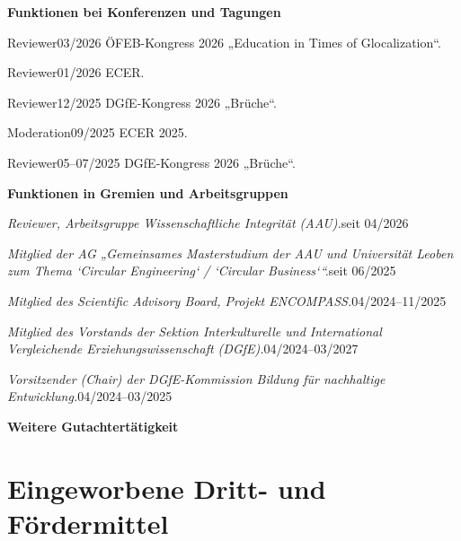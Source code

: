     \resumeProjectHeading
      {\textbf{Funktionen bei Konferenzen und Tagungen}}{}

    \resumeSubheading
      {Reviewer}{03/2026}
      {ÖFEB-Kongress 2026 „Education in Times of Glocalization“.}{}

    \resumeSubheading
      {Reviewer}{01/2026}
      {ECER.}{}

    \resumeSubheading
      {Reviewer}{12/2025}
      {DGfE-Kongress 2026 „Brüche“.}{}

    \resumeSubheading
      {Moderation}{09/2025}
      {ECER 2025.}{}

    \resumeSubheading
      {Reviewer}{05–07/2025}
      {DGfE-Kongress 2026 „Brüche“.}{}


    \resumeProjectHeading
      {\textbf{Funktionen in Gremien und Arbeitsgruppen}}{}

        \resumeProjectHeading
      {\textit{Reviewer, Arbeitsgruppe Wissenschaftliche Integrität (AAU).}}{seit 04/2026}


        \resumeProjectHeading
      {\textit{Mitglied der AG „Gemeinsames Masterstudium der AAU und Universität Leoben zum Thema ‘Circular Engineering‘ / ‘Circular Business‘“.}}{seit 06/2025}


        \resumeProjectHeading
      {\textit{Mitglied des Scientific Advisory Board, Projekt ENCOMPASS.}}{04/2024–11/2025}


        \resumeProjectHeading
      {\textit{Mitglied des Vorstands der Sektion Interkulturelle und International Vergleichende Erziehungswissenschaft (DGfE).}}{04/2024–03/2027}


        \resumeProjectHeading
      {\textit{Vorsitzender (Chair) der DGfE-Kommission Bildung für nachhaltige Entwicklung.}}{04/2024–03/2025}



    \resumeProjectHeading
      {\textbf{Weitere Gutachtertätigkeit}}{}

    \resumeItemListStart
    \resumeItemListEnd
  \resumeSubHeadingListEnd


\section{Eingeworbene Dritt- und Fördermittel}
  \vspace{3pt}
  \resumeSubHeadingListStart
    \resumeItemListStart
    \resumeItemListEnd

